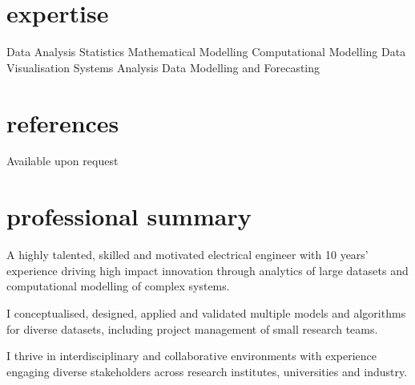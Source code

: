 \documentclass{friggeriEOSG-cv}
\begin{document}
\begin{aside}
\section{expertise}
\vspace{1.5em}
Data Analysis
\vspace{1.0em}
Statistics
\vspace{1.0em}
Mathematical Modelling
\vspace{1.0em}
Computational Modelling
\vspace{1.0em}
Data Visualisation
\vspace{1.0em}
Systems Analysis
\vspace{1.0em}
Data Modelling and Forecasting
\vspace{3.6em} %

\section{references}
\vspace{1.5em}
Available upon request
\end{aside}



\section{professional summary}
A highly talented, skilled and motivated electrical engineer with 10 years' experience driving high impact innovation through analytics of large datasets and computational modelling of complex systems.

\vspace{0.5\parsep}

I conceptualised, designed, applied and validated multiple models and algorithms for diverse datasets, including project management of small research teams.

\vspace{0.5\parsep}

I thrive in interdisciplinary and collaborative environments with experience engaging diverse stakeholders across research institutes, universities and industry. 

\vspace{1.0\parsep}
\end{document}
